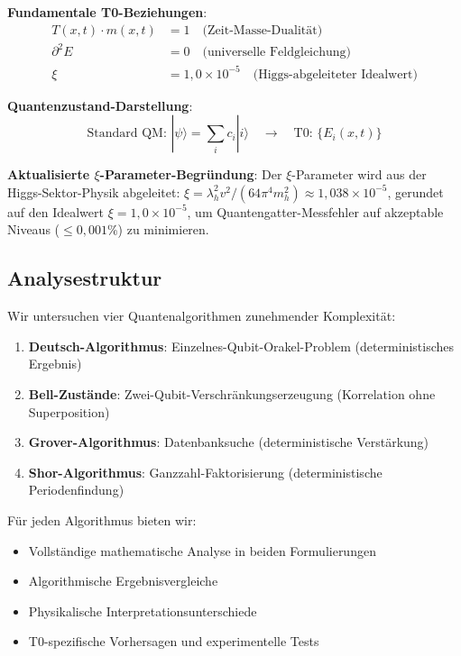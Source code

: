 \documentclass[12pt,a4paper]{article}
\newcommand{\Efield}{E}
\begin{document}
	\begin{tcolorbox}[colback=blue!5!white,colframe=blue!75!black,title=Kern-T0-Prinzipien mit aktualisiertem $\xi$-Parameter]
		\textbf{Fundamentale T0-Beziehungen}:
		\begin{align}
			T(x,t) \cdot m(x,t) &= 1 \quad \text{(Zeit-Masse-Dualität)} \\
			\partial^2 \Efield &= 0 \quad \text{(universelle Feldgleichung)} \\
			\xi &= 1,0 \times 10^{-5} \quad \text{(Higgs-abgeleiteter Idealwert)}
		\end{align}
		
		\textbf{Quantenzustand-Darstellung}:
		\begin{equation}
			\text{Standard QM: } |\psi\rangle = \sum_i c_i |i\rangle \quad \rightarrow \quad \text{T0: } \{\Efield_i(x,t)\}
		\end{equation}
		
		\textbf{Aktualisierte $\xi$-Parameter-Begründung}:
		Der $\xi$-Parameter wird aus der Higgs-Sektor-Physik abgeleitet: $\xi = \lambda_h^2 v^2/(64\pi^4 m_h^2) \approx 1,038 \times 10^{-5}$, gerundet auf den Idealwert $\xi = 1,0 \times 10^{-5}$, um Quantengatter-Messfehler auf akzeptable Niveaus ($\leq 0,001\%$) zu minimieren.
	\end{tcolorbox}
	
	\subsection{Analysestruktur}
	
	Wir untersuchen vier Quantenalgorithmen zunehmender Komplexität:
	
	\begin{enumerate}
		\item \textbf{Deutsch-Algorithmus}: Einzelnes-Qubit-Orakel-Problem (deterministisches Ergebnis)
		\item \textbf{Bell-Zustände}: Zwei-Qubit-Verschränkungserzeugung (Korrelation ohne Superposition)
		\item \textbf{Grover-Algorithmus}: Datenbanksuche (deterministische Verstärkung)
		\item \textbf{Shor-Algorithmus}: Ganzzahl-Faktorisierung (deterministische Periodenfindung)
	\end{enumerate}
	
	Für jeden Algorithmus bieten wir:
	\begin{itemize}
		\item Vollständige mathematische Analyse in beiden Formulierungen
		\item Algorithmische Ergebnisvergleiche
		\item Physikalische Interpretationsunterschiede
		\item T0-spezifische Vorhersagen und experimentelle Tests
	\end{itemize}
	
\end{document}
